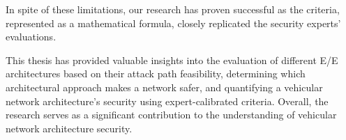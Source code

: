 In spite of these limitations, our research has proven successful as the criteria, 
represented as a mathematical formula, closely replicated the security experts' evaluations.

This thesis has provided valuable insights into the evaluation of different E/E architectures based on their attack path feasibility, 
determining which architectural approach makes a network safer, and quantifying a vehicular network architecture's security using expert-calibrated criteria.
Overall, the research serves as a significant contribution to the understanding of vehicular network architecture security.